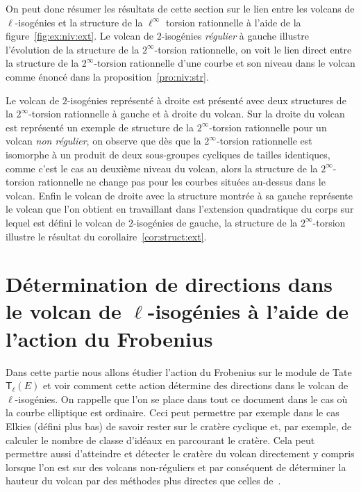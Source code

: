 \documentclass[10pt,a4paper]{book}
\theoremstyle{plain}
\theoremstyle{definition}
\theoremstyle{definition}
\theoremstyle{definition}
\theoremstyle{definition}
\theoremstyle{remark}
\theoremstyle{remark}
\theoremstyle{definition}
\begin{document}
On peut donc résumer les résultats de cette section sur le lien entre les 
volcans de $\ell$-isogénies et la structure de la $\ell^{\infty}$ torsion 
rationnelle à l'aide de la figure~\ref{fig:ex:niv:ext}. Le volcan de 
$2$-isogénies \emph{régulier} à gauche illustre l'évolution de la structure de
la $2^{\infty}$-torsion rationnelle, on voit le lien direct entre la 
structure de la $2^{\infty}$-torsion rationnelle d'une courbe et son niveau 
dans le volcan comme énoncé dans la proposition~\ref{pro:niv:str}. 

Le volcan de $2$-isogénies représenté à droite est présenté avec deux
structures de la $2^{\infty}$-torsion rationnelle à gauche et à droite du 
volcan. Sur la droite du volcan est représenté un exemple de structure de la 
$2^{\infty}$-torsion rationnelle pour un volcan \emph{non régulier}, on observe
que dès que la $2^{\infty}$-torsion rationnelle est isomorphe à un produit de 
deux sous-groupes cycliques de tailles identiques, comme c'est le cas au 
deuxième niveau du volcan, alors la structure de la $2^{\infty}$-torsion 
rationnelle ne change pas pour les courbes situées au-dessus dans le volcan. 
Enfin le volcan de droite avec la structure montrée à sa gauche représente le 
volcan que l'on obtient en travaillant dans l'extension quadratique du corps 
sur lequel est défini le volcan de $2$-isogénies de gauche, la structure de 
la $2^{\infty}$-torsion illustre le résultat du corollaire~\ref{cor:struct:ext}.

\chapter{Détermination de directions dans le volcan de $\ell$-isogénies à l'aide de l'action du Frobenius}
\label{cha:act:fro}
Dans cette partie nous allons étudier l'action du Frobenius sur  le module de
Tate $\mathsf{T}_{\ell}(E)$ et voir comment cette action  
détermine des directions dans le volcan de $\ell$-isogénies. On rappelle que 
l'on se place dans tout ce document dans le cas où la courbe elliptique est 
ordinaire.   Ceci peut permettre par exemple dans le cas Elkies (défini 
plus bas) de savoir rester sur le cratère cyclique et, par exemple, de calculer
le nombre de classe d'idéaux  en parcourant le cratère. Cela peut permettre aussi d'atteindre et 
détecter le cratère du volcan directement y compris lorsque l'on est sur des 
volcans non-réguliers et par conséquent de déterminer la hauteur du volcan par
des méthodes plus directes que celles de~\cite{FouquetMorain02}.
\end{document}
